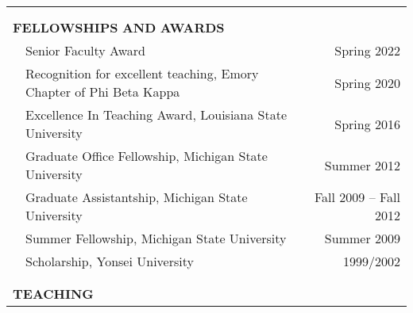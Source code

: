 \documentclass[10pt]{article}
\begin{document}
\begin{center}
\begin{tabular}{llllr}
\multicolumn{5}{l}{} \\\\
\multicolumn{5}{l}{{\Large \textbf{F}}\textbf{ELLOWSHIPS} \textbf{AND}
{\Large \textbf{A}}\textbf{WARDS}} \vspace{0.1cm}\\
& \multicolumn{3}{l}{Senior Faculty Award}& \multicolumn{1}{r}{Spring 2022} \\
& \multicolumn{3}{l}{Recognition for excellent teaching, Emory Chapter of Phi Beta Kappa}& \multicolumn{1}{r}{Spring 2020} \\
& \multicolumn{3}{l}{Excellence In Teaching Award, Louisiana State University}& \multicolumn{1}{r}{Spring 2016} \\
& \multicolumn{3}{l}{Graduate Office Fellowship, Michigan State University}& \multicolumn{1}{r}{Summer 2012} \\
& \multicolumn{3}{l}{Graduate Assistantship, Michigan State University} &
\multicolumn{1}{r}{Fall 2009 -- Fall 2012}\\
& \multicolumn{3}{l}{Summer Fellowship, Michigan State University}& \multicolumn{1}{r}{Summer 2009} \\
& \multicolumn{3}{l}{Scholarship, Yonsei University} &
\multicolumn{1}{r}{1999/2002}\\
\multicolumn{5}{l}{} \\\\
\multicolumn{5}{l}{{\Large \textbf{T}}\textbf{EACHING}} \vspace{0.1cm}\\

\end{tabular}
\end{center}
\end{document}
